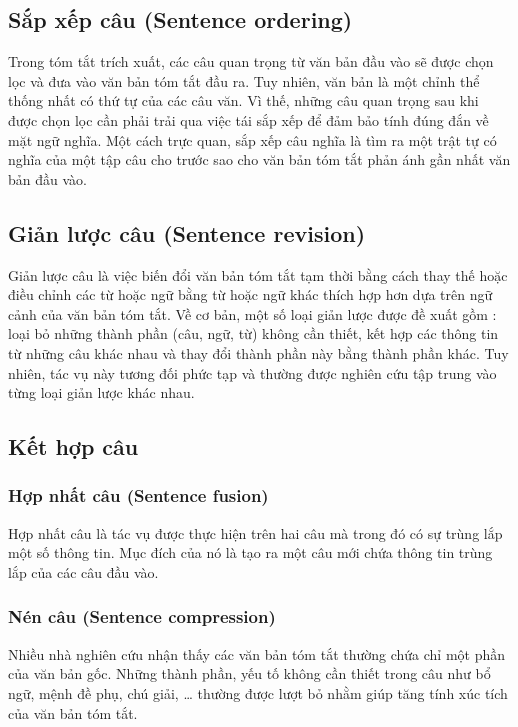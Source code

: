 \subsection{Sắp xếp câu (Sentence ordering)}
Trong tóm tắt trích xuất, các câu quan trọng từ văn bản đầu vào sẽ được chọn lọc và đưa vào văn bản tóm tắt đầu ra. Tuy nhiên, văn bản là một chỉnh thể thống nhất có thứ tự của các câu văn. Vì thế, những câu quan trọng sau khi được chọn lọc cần phải trải qua việc tái sắp xếp để đảm bảo tính đúng đắn về mặt ngữ nghĩa. Một cách trực quan, sắp xếp câu nghĩa là tìm ra một trật tự có nghĩa của một tập câu cho trước sao cho văn bản tóm tắt phản ánh gần nhất văn bản đầu vào. 

\subsection{Giản lược câu (Sentence revision)}
Giản lược câu là việc biến đổi văn bản tóm tắt tạm thời bằng cách thay thế hoặc điều chỉnh các từ hoặc ngữ bằng từ hoặc ngữ khác thích hợp hơn dựa trên ngữ cảnh của văn bản tóm tắt. Về cơ bản, một số loại giản lược được đề xuất gồm : loại bỏ những thành phần (câu, ngữ, từ) không cần thiết, kết hợp các thông tin từ những câu khác nhau và thay đổi thành phần này bằng thành phần khác. Tuy nhiên, tác vụ này tương đối phức tạp và thường được nghiên cứu tập trung vào từng loại giản lược khác nhau.

\subsection{Kết hợp câu}

\subsubsection{Hợp nhất câu (Sentence fusion)}
Hợp nhất câu là tác vụ được thực hiện trên hai câu mà trong đó có sự trùng lắp một số thông tin. Mục đích của nó là tạo ra một câu mới chứa thông tin trùng lắp của các câu đầu vào.


\subsubsection{Nén câu (Sentence compression)}
Nhiều nhà nghiên cứu nhận thấy các văn bản tóm tắt thường chứa chỉ một phần của văn bản gốc. Những thành phần, yếu tố không cần thiết trong câu như bổ ngữ, mệnh đề phụ, chú giải, … thường được lượt bỏ nhằm giúp tăng tính xúc tích của văn bản tóm tắt. 


